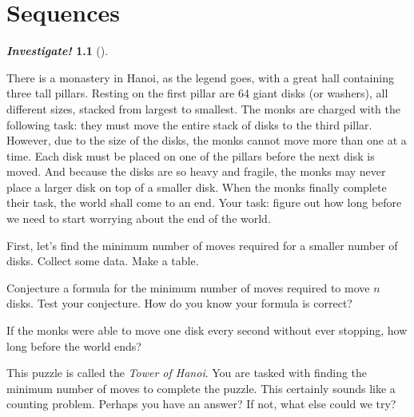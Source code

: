 \documentclass[10pt,]{book}
\theoremstyle{plain}
\theoremstyle{definition}
\theoremstyle{definition}
\newtheorem{investigation}[project]{\emph{Investigate!}}
\theoremstyle{definition}
\numberwithin{equation}{chapter}
\begin{document}
\chapter[Sequences]{Sequences}\label{ch_sequences}
\typeout{************************************************}
\typeout{************************************************}
\begin{investigation}[]\label{investigation-15}

      There is a monastery in Hanoi, as the legend goes, with a great hall containing three tall pillars. Resting on the first pillar are 64 giant disks (or washers), all different sizes, stacked from largest to smallest. The monks are charged with the following task: they must move the entire stack of disks to the third pillar. However, due to the size of the disks, the monks cannot move more than one at a time. Each disk must be placed on one of the pillars before the next disk is moved. And because the disks are so heavy and fragile, the monks may never place a larger disk on top of a smaller disk. When the monks finally complete their task, the world shall come to an end. Your task: figure out how long before we need to start worrying about the end of the world.
%
\par

              First, let's find the minimum number of moves required for a smaller number of disks. Collect some data. Make a table.
\par

              Conjecture a formula for the minimum number of moves required to move \(n\) disks. Test your conjecture. How do you know your formula is correct?
\par

              If the monks were able to move one disk every second without ever stopping, how long before the world ends?
\end{investigation}

      This puzzle is called the \emph{Tower of Hanoi}. You are tasked with finding the minimum number of moves to complete the puzzle. This certainly sounds like a counting problem. Perhaps you have an answer? If not, what else could we try?
%
\par
\end{document}
